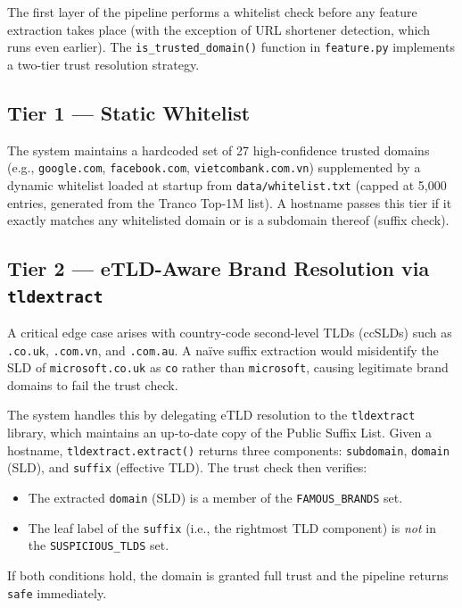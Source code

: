 \documentclass[12pt,a4paper]{article}
\begin{document}
The first layer of the pipeline performs a whitelist check before any feature extraction takes place (with the exception of URL shortener detection, which runs even earlier). The \texttt{is\_trusted\_domain()} function in \texttt{feature.py} implements a two-tier trust resolution strategy.

\subsection{Tier 1 --- Static Whitelist}

The system maintains a hardcoded set of 27 high-confidence trusted domains (e.g., \texttt{google.com}, \texttt{facebook.com}, \texttt{vietcombank.com.vn}) supplemented by a dynamic whitelist loaded at startup from \texttt{data/whitelist.txt} (capped at 5,000 entries, generated from the Tranco Top-1M list). A hostname passes this tier if it exactly matches any whitelisted domain or is a subdomain thereof (suffix check).

\subsection{Tier 2 --- eTLD-Aware Brand Resolution via \texttt{tldextract}}

A critical edge case arises with country-code second-level TLDs (ccSLDs) such as \texttt{.co.uk}, \texttt{.com.vn}, and \texttt{.com.au}. A na\"ive suffix extraction would misidentify the SLD of \texttt{microsoft.co.uk} as \texttt{co} rather than \texttt{microsoft}, causing legitimate brand domains to fail the trust check.

The system handles this by delegating eTLD resolution to the \texttt{tldextract} library, which maintains an up-to-date copy of the Public Suffix List. Given a hostname, \texttt{tldextract.extract()} returns three components: \texttt{subdomain}, \texttt{domain} (SLD), and \texttt{suffix} (effective TLD). The trust check then verifies:

\begin{itemize}
    \item The extracted \texttt{domain} (SLD) is a member of the \texttt{FAMOUS\_BRANDS} set.
    \item The leaf label of the \texttt{suffix} (i.e., the rightmost TLD component) is \textit{not} in the \texttt{SUSPICIOUS\_TLDS} set.
\end{itemize}

\noindent If both conditions hold, the domain is granted full trust and the pipeline returns \texttt{safe} immediately.
\end{document}
